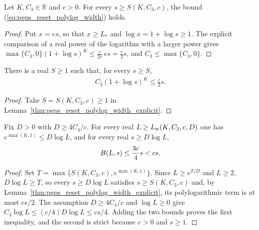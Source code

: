 \begin{lemma}
    \label{thm:peps_reset_polylog_width_explicit}
    \leanok
    Let $K,C_3\in\mathbb R$ and $c>0$. For every $s\ge S(K,C_3,c)$, the bound
    (\ref{eq:peps_reset_polylog_width}) holds.
\end{lemma}
\begin{proof}
    \leanok
    Put $x=es$, so that $x\ge L_*$ and $\log x=1+\log s\ge1$. The explicit
    comparison of a real power of the logarithm with a larger power gives
    $\max\{C_3,0\}(1+\log s)^K\le\frac{c}{2e}\,es=\frac c2s$, and
    $C_3\le\max\{C_3,0\}$.
\end{proof}

\begin{lemma}
    \label{thm:peps_reset_polylog_width}
    \leanok
    There is a real $S\ge1$ such that, for every $s\ge S$,
    \begin{align}
        C_3(1+\log s)^K\le \frac c2s.
        \label{eq:peps_reset_polylog_width}
    \end{align}
\end{lemma}
\begin{proof}
    \leanok
    Take $S=S(K,C_3,c)\ge1$ in
    Lemma~\ref{thm:peps_reset_polylog_width_explicit}.
\end{proof}

\begin{lemma}
    \label{thm:peps_angular_reset_uniform_width_explicit}
    \leanok
    Fix $D>0$ with $D\ge4C_4/c$. For every real $L\ge L_{\rm w}(K,C_3,c,D)$ one has
    $e^{\max(K,1)}\le D\log L$, and for every real $s\ge D\log L$,
    \begin{align}
        B(L,s)\le\frac{3c}{4}s<cs.
        \notag
    \end{align}
\end{lemma}
\begin{proof}
    \leanok
    Set $T=\max\{S(K,C_3,c),e^{\max(K,1)}\}$. Since $L\ge e^{T/D}$ and $L\ge2$,
    $D\log L\ge T$, so every $s\ge D\log L$ satisfies $s\ge S(K,C_3,c)$ and,
    by Lemma~\ref{thm:peps_reset_polylog_width_explicit}, its
    polylogarithmic term is at most $cs/2$.
    The assumption $D\ge 4C_4/c$ and $\log L\ge0$ give
    $C_4\log L\le(c/4)D\log L\le cs/4$.
    Adding the two bounds proves the first inequality, and the second is strict because
    $c>0$ and $s\ge1$.
\end{proof}

